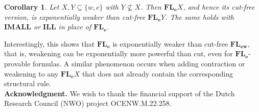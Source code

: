 \documentclass[12pt,a4paper]{article}
\theoremstyle{plain}
\newtheorem{corollary}[theorem]{Corollary}
\theoremstyle{definition}
\begin{document}
\begin{corollary}
Let $X, Y \subseteq \{w,c\}$ with $Y \nsubseteq X$. Then $\mathbf{FL_e}X$, and hence its cut-free version, is exponentially weaker than cut-free $\mathbf{FL_e}Y$. The same holds with $\mathbf{IMALL}$ or $\mathbf{ILL}$ in place of $\mathbf{FL_e}$.
\end{corollary}

Interestingly, this shows that $\mathbf{FL_{e}}$ is exponentially weaker than cut-free $\mathbf{FL_{ew}}$, that is, weakening can be exponentially more powerful than cut, even for $\mathbf{FL_e}$-provable formulas. A similar phenomenon occurs when adding contraction or weakening to any $\mathbf{FL_e}X$ that does not already contain the corresponding structural rule. \\

\noindent \textbf{Acknowledgment.} We wish to thank the financial support of the Dutch Research Council (NWO) project OCENW.M.22.258.





\end{document}
